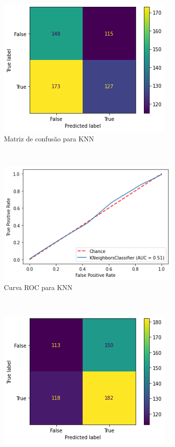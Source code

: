 \begin{figure}[htb] 
    \centering 
    \caption{Resultado das tentativas de classificação para cada método aplicado sobre dados de CNAEs para impacto total}
    \label{fig:resultados:classification-total-cnae} 
    \begin{subfigure}[b]{0.45\textwidth}
        \includegraphics[scale=0.55]{images/base-de-dados-28.4.5-confusion-matrix-knn-total-cnae.png}
        \caption{Matriz de confusão para KNN}
        \label{fig:resultados:base-de-dados-28.3.5-confusion-matrix-knn-total-cnae}
    \end{subfigure} ~ \quad
    \begin{subfigure}[b]{0.45\textwidth}
        \includegraphics[scale=0.55]{images/base-de-dados-28.4.6-roc-curve-knn-total-cnae.png}
        \caption{Curva ROC para KNN}
        \label{fig:resultados:base-de-dados-28.3.6-roc-curve-knn-total-cnae}
    \end{subfigure} ~ \\
    \begin{subfigure}[b]{0.45\textwidth}
        \includegraphics[scale=0.55]{images/base-de-dados-28.4.1-confusion-matrix-randomforest-total-cnae.png}

\end{subfigure}
\end{figure}
